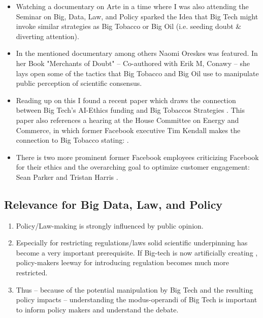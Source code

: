 \begin{itemize}
    \item Watching a documentary on Arte \citep{cuveillier_forschung_2020} in a time where I was also attending the Seminar on Big, Data, Law, and Policy sparked the Idea that Big Tech might invoke similar strategies as Big Tobacco or Big Oil (i.e. seeding doubt \& diverting attention).
    \item In the mentioned documentary among others Naomi Oreskes was featured. In her Book "Merchants of Doubt" \citep{oreskes_merchants_2010} -- Co-authored with Erik M, Conawy -- she lays open some of the tactics that Big Tobacco and Big Oil use to manipulate public perception of scientific consensus.
    \item Reading up on this I found a recent paper which draws the connection between Big Tech's AI-Ethics funding and Big Tobaccos Strategies  \citep{abdalla_grey_2021}. This paper also references a hearing at the House Committee on Energy and Commerce, in which former Facebook executive Tim Kendall makes the connection to Big Tobacco stating:  \citep{kendall_house_2020}.
    \item There is two more prominent former Facebook employees criticizing Facebook for their ethics and the overarching goal to optimize customer engagement: Sean Parker \citep{allen_sean_2017} and Tristan Harris \citep{metz_smartphones_2017}.
\end{itemize}

\subsection{Relevance for Big Data, Law, and Policy}
\begin{enumerate}
    \item Policy/Law-making is strongly influenced by public opinion.
    \item Especially for restricting regulations/laws solid scientific underpinning has become a very important prerequisite. If Big-tech is now artificially creating , policy-makers leeway for introducing regulation becomes much more restricted.
    \item Thus -- because of the potential manipulation by Big Tech and the resulting policy impacts -- understanding the modus-operandi of Big Tech is important to inform policy makers and understand the debate.
\end{enumerate}

